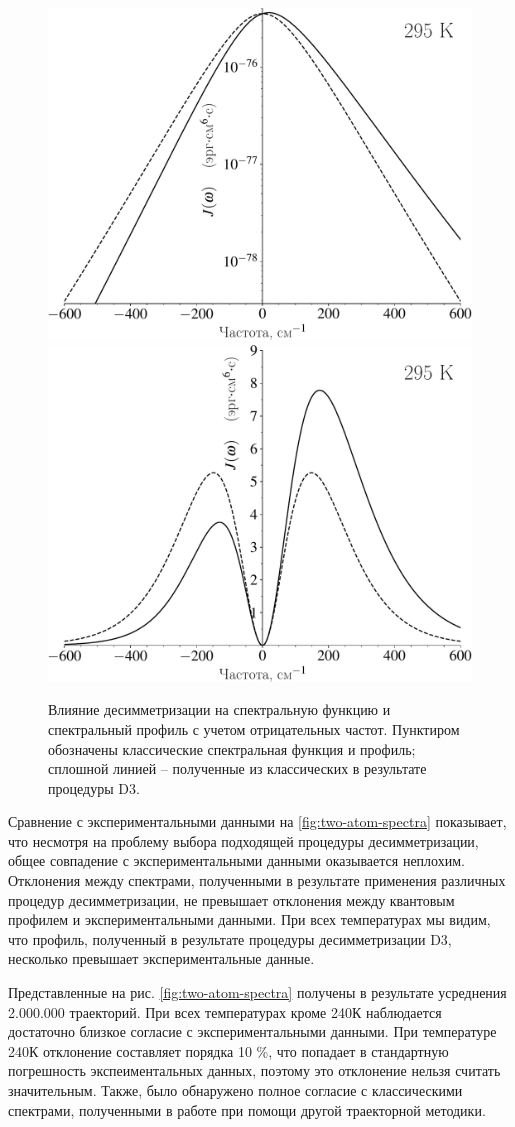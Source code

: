 \begin{figure}[H]
    \centering
    \includegraphics[width=0.49\linewidth]{./pictures/two_atom_spectra/spectral_function_d3-crop.pdf}
    \includegraphics[width=0.49\linewidth]{./pictures/two_atom_spectra/spectrum_effect_d3-crop.pdf}
    \caption{Влияние десимметризации на спектральную функцию и спектральный профиль с учетом отрицательных частот. Пунктиром обозначены классические спектральная функция и профиль; сплошной линией -- полученные из классических в результате процедуры D3.}
\end{figure}

Сравнение с экспериментальными данными на \ref{fig:two-atom-spectra} показывает, что несмотря на проблему выбора подходящей процедуры десимметризации, общее совпадение с экспериментальными данными оказывается неплохим. Отклонения между спектрами, полученными в результате применения различных процедур десимметризации, не превышает отклонения между квантовым профилем и экспериментальными данными. При всех температурах мы видим, что профиль, полученный в результате процедуры десимметризации D3, несколько превышает экспериментальные данные. \par 
Представленные на рис. \ref{fig:two-atom-spectra} получены в результате усреднения 2.000.000 траекторий. При всех температурах кроме 240К наблюдается достаточно близкое согласие с экспериментальными данными. При температуре 240К отклонение составляет порядка 10 \%, что попадает в стандартную погрешность экспеиментальных данных, поэтому это отклонение нельзя считать значительным. Также, было обнаружено полное согласие с классическими спектрами, полученными в работе \cite{buryak2014} при помощи другой траекторной методики. 

